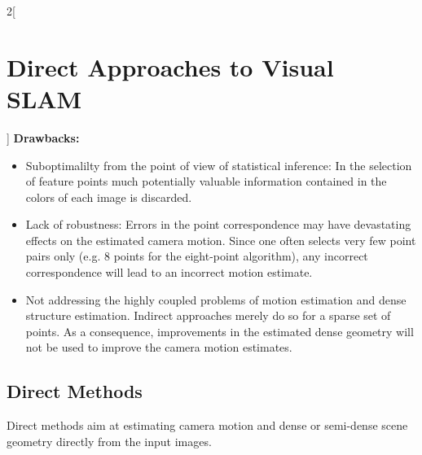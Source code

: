\documentclass[oneside,fontsize=11pt,paper=a4]{scrartcl}
\begin{document}
\begin{multicols}{2}[\section{Direct Approaches to Visual SLAM}]
\textbf{Drawbacks:}
\begin{itemize}
	\item Suboptimalilty from the point of view of statistical inference: In the selection of feature points much potentially valuable information contained in the colors of each image is discarded.
	\item Lack of robustness: Errors in the point correspondence may have devastating effects on the estimated camera motion. Since one often selects very few point pairs only (e.g. 8 points for the eight-point algorithm), any incorrect correspondence will lead to an incorrect motion estimate.
	\item Not addressing the highly coupled problems of motion estimation and dense structure estimation. Indirect approaches merely do so for a sparse set of points. As a consequence, improvements in the estimated dense geometry will not be used to improve the camera motion estimates.
\end{itemize}

\subsection{Direct Methods}
Direct methods aim at estimating camera motion and dense or semi-dense scene geometry directly from the input images.\\
\vspace{3mm}


\end{multicols}
\end{document}
